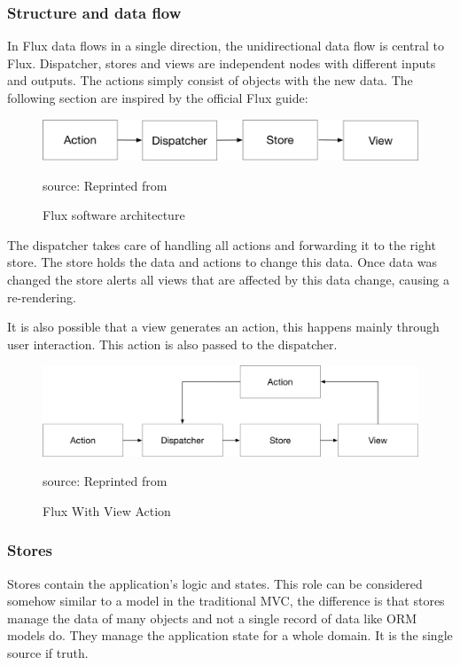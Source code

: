 \subsubsection{Structure and data flow}

In Flux data flows in a single direction, the unidirectional data flow is central to Flux. Dispatcher, stores and views are independent nodes with different inputs and outputs. The actions simply consist of objects with the new data. The following section are inspired by the official Flux guide: \cite{Flux}


\begin{figure}[H]
	\centering
	\includegraphics[width=0.8\linewidth]{bilder/grundlagen/UniDirection.png}
	\caption{Flux software architecture} source: Reprinted from \cite{Flux}
	\label{fig:FLUX}
\end{figure}

The dispatcher takes care of handling all actions and forwarding it to the right store. The store holds the data and actions to change this data. Once data was changed the store alerts all views that are affected by this data change, causing a re-rendering.

It is also possible that a view generates an action, this happens mainly through user interaction. This action is also passed to the dispatcher. 


\begin{figure}[H]
	\centering
	\includegraphics[width=0.8\linewidth]{bilder/grundlagen/uniDirection2.png}
	\caption{Flux With View Action} source: Reprinted from \cite{Flux}
	\label{fig:FA}
\end{figure}



\subsubsection{Stores}
Stores contain the application's logic and states. This role can be considered somehow similar to a model in the traditional MVC, the difference is that stores manage the data of many objects and not a single record of data like ORM models do. They manage the application state for a whole domain. It is the single source if truth.


